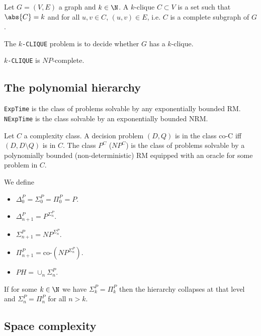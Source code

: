 \documentclass{article}
\begin{document}
\begin{definition*}[CLIQUE]
	Let $G=(V,E)$ a graph and $k\in\N$. A $k$-clique $C\subset V$ is a 
	set such that $\abs{C} = k$ and for all $u,v\in C$, $(u,v)\in E$,
	i.e. $C$ is a complete subgraph of $G$.

	The \texttt{$k$-CLIQUE} problem is to decide whether $G$ has a $k$-clique.
\end{definition*}

\begin{theorem*}[II.22]
	\texttt{$k$-CLIQUE} is $NP$-complete.	
\end{theorem*}

\subsection{The polynomial hierarchy}

\begin{definition*}[ExpTime]
	\texttt{ExpTime} is the class of problems solvable by any exponentially
	bounded RM. \texttt{NExpTime} is the class solvable by an exponentially
	bounded NRM.	
\end{definition*}

\begin{definition*}
	Let $C$ a complexity class. A decision problem $(D,Q)$ is in the class
	co-C iff $(D, D\setminus Q)$ is in $C$. The class $P^C$ ($NP^C$) is the 
	class of problems solvable by a polynomially bounded (non-deterministic)
	RM equipped with an oracle for some problem in $C$.

	We define 
	\begin{itemize}
		\item $\Delta_0^P=\Sigma_0^P=\Pi_0^P=P$.
		\item $\Delta_{n+1}^P=P^{\Sigma_n^P}$.
		\item $\Sigma_{n+1}^P=NP^{\Sigma_n^P}$.
		\item $\Pi_{n+1}^P=\text{co-}\left(NP^{\Sigma_n^P}\right)$.
		\item $PH=\cup_n \Sigma_n^P$.
	\end{itemize}
\end{definition*}

\begin{theorem*}[II.26]
	If for some $k\in\N$ we have $\Sigma_k^P = \Pi_k^P$ then the hierarchy 
	collapses at that level and $\Sigma_n^P = \Pi_n^P$ for all $n>k$.
\end{theorem*}

\subsection{Space complexity}
\end{document}

